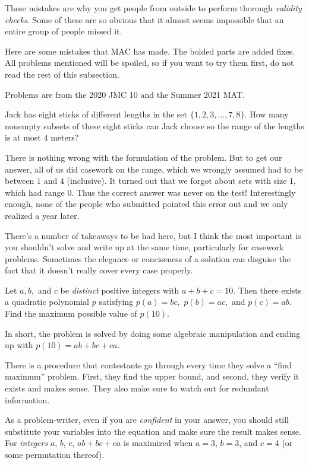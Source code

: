 \documentclass[points=false]{bounce}
\begin{document}
These mistakes are why you get people from outside to perform thorough \emph{validity checks}. Some of these are so obvious that it almost seems impossible that an entire group of people missed it.

Here are some mistakes that MAC has made. The bolded parts are added fixes. All problems mentioned will be spoiled, so if you want to try them first, do not read the rest of this subsection.

Problems are from the 2020 JMC 10 and the Summer 2021 MAT.

\begin{exam}[JMC 10 2020/11]
    Jack has eight sticks of different lengths in the set $\{1,2,3,\dots,7,8\}$. How many nonempty subsets of these eight sticks can Jack choose so the range of the lengths is at most $4$ meters?
\end{exam}

There is nothing wrong with the formulation of the problem. But to get our answer, all of us did casework on the range, which we wrongly assumed had to be between $1$ and $4$ (inclusive). It turned out that we forgot about sets with size $1$, which had range $0$. Thus the correct answer was never on the test! Interestingly enough, none of the people who submitted pointed this error out and we only realized a year later.

There's a number of takeaways to be had here, but I think the most important is you shouldn't solve and write up at the same time, particularly for casework problems. Sometimes the elegance or conciseness of a solution can disguise the fact that it doesn't really cover every case properly.

\begin{exam}[MAT 2021/5]
    Let $a, b,$ and $c$ be \emph{distinct} positive integers with $a + b + c = 10.$ Then there exists a quadratic polynomial $p$ satisfying $p(a) = bc,$ $p(b) = ac,$ and $p(c) = ab.$ Find the maximum possible value of $p(10).$
\end{exam}

In short, the problem is solved by doing some algebraic manipulation and ending up with $p(10)=ab+bc+ca$.

There is a procedure that contestants go through every time they solve a ``find maximum'' problem. First, they find the upper bound, and second, they verify it exists and makes sense. They also make sure to watch out for redundant information.

As a problem-writer, even if you are \emph{confident} in your answer, you should still substitute your variables into the equation and make sure the result makes sense. For \emph{integers} $a$, $b$, $c$, $ab+bc+ca$ is maximized when $a=3$, $b=3$, and $c=4$ (or some permutation thereof).
\end{document}
